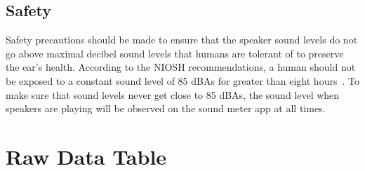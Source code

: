 \documentclass[index]{subfiles}
\begin{document}
\subsection{Safety}

Safety precautions should be made to ensure that the speaker sound levels do not go above maximal decibel sound levels that humans are tolerant of to preserve the ear's health. According to the NIOSH recommendations, a human should not be exposed to a constant sound level of 85 dBAs for greater than eight hours~\cite{cdc}. To make sure that sound levels never get close to 85 dBAs, the sound level when speakers are playing will be observed on the sound meter app at all times.

\section{Raw Data Table}

\end{document}
